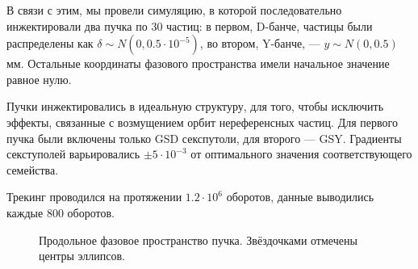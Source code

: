 В связи с этим, мы провели симуляцию, в которой последовательно инжектировали два пучка по 30 частиц: в первом, D-банче, частицы были распределены как $\delta\sim N(0, 0.5\cdot 10^{-5})$, во втором, Y-банче, --- $y\sim N(0, 0.5)$ мм. Остальные координаты фазового пространства имели начальное значение равное нулю. 

Пучки инжектировались в идеальную структуру, для того, чтобы исключить эффекты, связанные с возмущением орбит нереференсных частиц. Для первого пучка были включены только GSD секспутоли, для второго --- GSY. Градиенты секступолей варьировались $\pm 5\cdot 10^{-3}$ от оптимального значения соответствующего семейства.

Трекинг проводился на протяжении $1.2\cdot 10^6$ оборотов, данные выводились каждые 800 оборотов.

\begin{figure}[h]
	\centering
	\caption[Продольное фазовое пространство пучка. Звёздочками отмечены центры эллипсов]{Продольное фазовое пространство пучка. Звёздочками отмечены центры эллипсов.\label{fig:long_PS_sext_settings}}
\end{figure}


